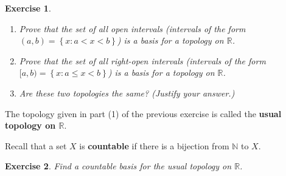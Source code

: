 \documentclass[12pt]{amsart}
\newtheorem{exercise}{Exercise}[section]
\theoremstyle{definition}
\theoremstyle{remark}
\newcommand{\R}{\mathbb{R}}
\newcommand{\N}{\mathbb{N}}
\newcommand{\explicitSet}[1]{\left\lbrace #1 \right\rbrace}
\newcommand{\set}[2]{\explicitSet{#1 \colon #2}}
\newcommand{\0}{\emptyset}
\begin{document}
\begin{exercise}
\begin{enumerate}
\item Prove that the set of all open intervals (intervals of the form $(a,b) = \set{x}{a < x < b}$) is a basis for a topology on $\R$.
\item Prove that the set of all right-open intervals (intervals of the form $[a,b) = \set{x}{a \leq x < b}$) is a basis for a topology on $\R$.
\item Are these two topologies the same? (Justify your answer.)
\end{enumerate}
\end{exercise}

The topology given in part (1) of the previous exercise is called the \textbf{usual topology on $\R$}.

Recall that a set $X$ is \textbf{countable} if there is a bijection from $\N$ to $X$.

\begin{exercise}
Find a countable basis for the usual topology on $\R$.
\end{exercise}
\end{document}
